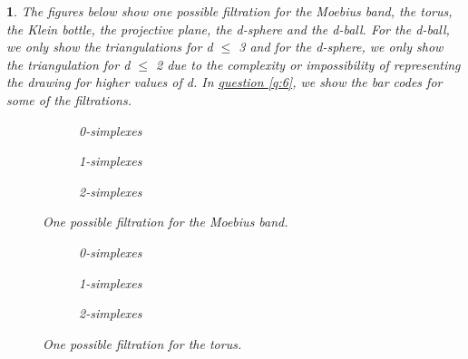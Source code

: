 \documentclass[10pt]{article} %
\theoremstyle{problemstyle}
\newtheorem{question}{\arabic{question}}
\begin{document}
\begin{question} %
The figures below show one possible filtration for the Moebius band, the torus, the Klein bottle, the projective plane, the d-sphere and the d-ball. For the d-ball, we only show the triangulations for d $\leq$ 3 and for the d-sphere, we only show the triangulation for d $\leq$ 2 due to the complexity or impossibility of representing the drawing for higher values of d. In \hyperref[q:6]{question \ref*{q:6}}, we show the bar codes for some of the filtrations.

\begin{figure}[H]
\centering
   \begin{subfigure}{0.3\linewidth}
	   	\begin{mdframed}[roundcorner=10pt]
	   		\centering
	   		
	   	\end{mdframed}
	   	\caption{0-simplexes}
	    \label{fig:mb-0-simplex} 
    \end{subfigure}
     \hfill
	\begin{subfigure}{0.3\linewidth}
	   	\begin{mdframed}[roundcorner=10pt]
	   		\centering
			
		\end{mdframed}
		\caption{1-simplexes}
		\label{fig:mb-1-simplex} 
	\end{subfigure}
	\hfill
	\begin{subfigure}[H]{0.3\linewidth}
   		\begin{mdframed}[roundcorner=10pt]
   			\centering
   			
   		\end{mdframed}
   		\caption{2-simplexes}
   		\label{fig:mb-2-simplex}
	\end{subfigure}
\centering
\caption{One possible filtration for the Moebius band.}
\label{fig:mb}
\end{figure}

\begin{figure}[H]
	\centering
	\begin{subfigure}{0.3\linewidth}
		
		\begin{mdframed}[roundcorner=10pt]
			\centering
			
		\end{mdframed}
		\caption{0-simplexes}
		\label{fig:to-0-simplex} 
	\end{subfigure}
	\hfill
	\begin{subfigure}{0.3\linewidth}
		\begin{mdframed}[roundcorner=10pt]
			\centering
			
		\end{mdframed}
		\caption{1-simplexes}
		\label{fig:to-1-simplex} 
	\end{subfigure}
	\hfill
	\begin{subfigure}[H]{0.3\linewidth}
		\centering
		\begin{mdframed}[roundcorner=10pt]
			\centering
			
		\end{mdframed}
		\caption{2-simplexes}
		\label{fig:to-2-simplex}
	\end{subfigure}
	\centering
	\caption{One possible filtration for the torus.}
	\label{fig:to}
\end{figure}


\end{question}
\end{document}

